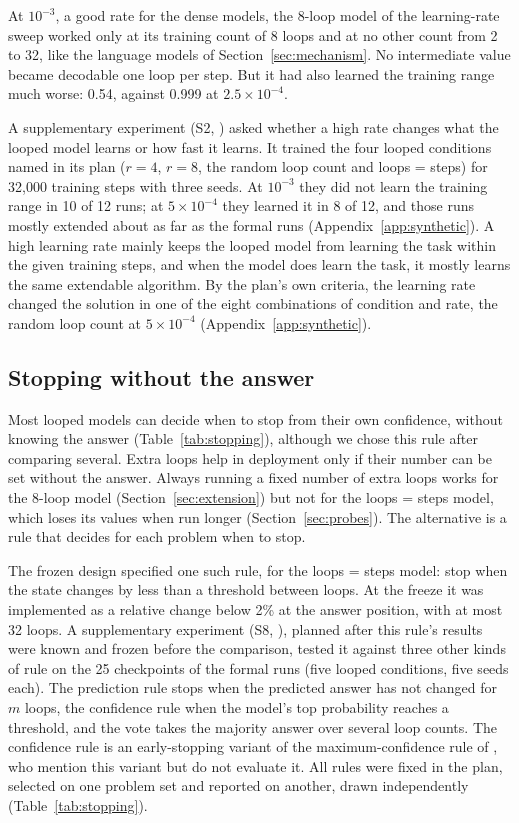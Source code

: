 At $10^{-3}$, a good rate for the dense models, the 8-loop model of the learning-rate sweep worked only at its training
count of 8 loops and at no other count from 2 to 32, like the language models of Section~\ref{sec:mechanism}. No
intermediate value became decodable one loop per step. But it had also learned the training range much worse: 0.54,
against 0.999 at $2.5\times10^{-4}$.

A supplementary experiment (S2, ) asked whether a high rate changes what the looped model learns or
how fast it learns. It trained the four looped conditions named in its plan ($r = 4$, $r = 8$, the random loop count
and loops = steps) for 32{,}000 training steps with three seeds. At $10^{-3}$ they did not learn the training range in
10 of 12 runs; at $5\times10^{-4}$ they learned it in 8 of 12, and those runs mostly extended about as far as the formal
runs (Appendix~\ref{app:synthetic}). A high learning rate mainly keeps the looped model from learning the task within
the given training steps, and when the model does learn the task, it mostly learns the same extendable algorithm. By
the plan's own criteria, the learning rate changed the solution in one of the eight combinations of condition and
rate, the random loop count at $5\times10^{-4}$ (Appendix~\ref{app:synthetic}).

\subsection{Stopping without the answer}
\label{sec:stopping}

Most looped models can decide when to stop from their own confidence, without knowing the answer
(Table~\ref{tab:stopping}), although we chose this rule after comparing several. Extra loops help in deployment only if
their number can be set without the answer. Always running a fixed number of
extra loops works for the 8-loop model (Section~\ref{sec:extension}) but not for the loops = steps model, which loses
its values when run longer (Section~\ref{sec:probes}). The alternative is a rule that decides for each problem when to
stop.

The frozen design specified one such rule, for the loops = steps model: stop when the state changes by less than a
threshold between loops. At the freeze it was implemented as a relative change below 2\% at the answer position, with
at most 32 loops. A supplementary experiment (S8, ), planned after this rule's results were known
and frozen before the comparison, tested it against three other kinds of rule on the 25 checkpoints of the formal runs
(five looped conditions, five seeds each). The prediction rule stops when the predicted answer has not changed for $m$
loops, the confidence rule when the model's top probability reaches a threshold, and the vote takes the majority answer
over several loop counts. The confidence rule is an early-stopping variant of the maximum-confidence rule of
\citet{fan2025looped}, who mention this variant but do not evaluate it. All rules were fixed in the plan, selected on
one problem set and reported on another, drawn independently (Table~\ref{tab:stopping}).

